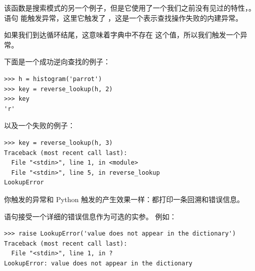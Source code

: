 该函数是搜索模式的另一个例子，但是它使用了一个我们之前没有见过的特性，。  语句 能触发异常，这里它触发了 ，这是一个表示查找操作失败的内建异常。

  
 
 


如果我们到达循环结尾，这意味着字典中不存在  这个值，所以我们触发一个异常。


下面是一个成功逆向查找的例子：

\begin{lstlisting}
>>> h = histogram('parrot')
>>> key = reverse_lookup(h, 2)
>>> key
'r'
\end{lstlisting}

%

以及一个失败的例子：

\begin{lstlisting}
>>> key = reverse_lookup(h, 3)
Traceback (most recent call last):
  File "<stdin>", line 1, in <module>
  File "<stdin>", line 5, in reverse_lookup
LookupError
\end{lstlisting}

%

你触发的异常和 Python 触发的产生效果一样：都打印一条回溯和错误信息。

  


 语句接受一个详细的错误信息作为可选的实参。  例如：

\begin{lstlisting}
>>> raise LookupError('value does not appear in the dictionary')
Traceback (most recent call last):
  File "<stdin>", line 1, in ?
LookupError: value does not appear in the dictionary
\end{lstlisting}

%

